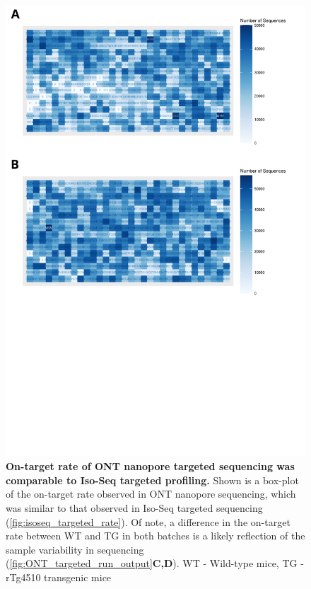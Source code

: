 \begin{figure}[]
	\centering
	\includegraphics[page=5,trim={0 27cm 0 0cm},clip,scale = 0.5]{Figures/ONTTargetedTranscriptome.pdf}
	\captionsetup{width=0.95\textwidth}
	\caption[On-target rate of ONT targeted profiling]%
	{\textbf{On-target rate of ONT nanopore targeted sequencing was comparable to Iso-Seq targeted profiling.} Shown is a box-plot of the on-target rate observed in ONT nanopore sequencing, which was similar to that observed in Iso-Seq targeted sequencing (\cref{fig:isoseq_targeted_rate}). Of note, a difference in the on-target rate between WT and TG in both batches is a likely reflection of the sample variability in sequencing (\cref{fig:ONT_targeted_run_output}\textbf{C,D}). WT - Wild-type mice, TG - rTg4510 transgenic mice}
	\label{fig:ont_targeted_rate}
\end{figure}

